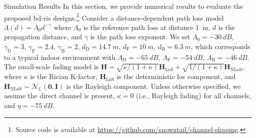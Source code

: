 \documentclass[journal]{IEEEtran}
\begin{document}
\begin{section}{Simulation Results}
	\label{sc:simulation}
	In this section, we provide numerical results to evaluate the proposed \gls{bd}-\gls{ris} designs.\footnote{Source code is available at \url{https://github.com/snowztail/channel-shaping}.}
	Consider a distance-dependent path loss model $\Lambda(d) = \Lambda_0 d^{-\gamma}$ where $\Lambda_0$ is the reference path loss at distance \qty{1}{m}, $d$ is the propagation distance, and $\gamma$ is the path loss exponent.
	We set $\Lambda_0=\qty{-30}{dB}$, $\gamma_\mathrm{D}=3$, $\gamma_\mathrm{F}=2.4$, $\gamma_\mathrm{B}=2$, $d_\mathrm{D}=\qty{14.7}{m}$, $d_\mathrm{F}=\qty{10}{m}$, $d_\mathrm{B}=\qty{6.3}{m}$, which corresponds to a typical indoor environment with $\Lambda_\mathrm{D}=\qty{-65}{dB}$, $\Lambda_\mathrm{F}=\qty{-54}{dB}$, $\Lambda_\mathrm{B}=\qty{-46}{dB}$.
	The small-scale fading model is $\mathbf{H} = \sqrt{\kappa/(1+\kappa)} \mathbf{H}_\text{LoS} + \sqrt{1/(1+\kappa)} \mathbf{H}_\text{NLoS}$, where $\kappa$ is the Rician K-factor, $\mathbf{H}_\text{LoS}$ is the deterministic \gls{los} component, and $\mathbf{H}_\text{NLoS} \sim \mathcal{N}_{\mathbb{C}}(\mathbf{0}, \mathbf{I})$ is the Rayleigh component.
	Unless otherwise specified, we assume the direct channel is present, $\kappa = 0$ (i.e., Rayleigh fading) for all channels, and $\eta = \qty{-75}{dB}$.


\end{section}
\end{document}
